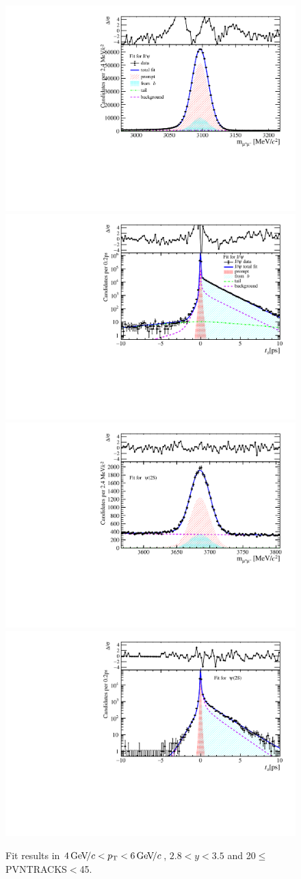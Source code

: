 \begin{figure}[H]
\begin{center}
\includegraphics[width=0.47\linewidth]{pdf/Jpsi/drawmass/n2y2pt3.pdf}
\includegraphics[width=0.47\linewidth]{pdf/Jpsi/2DFit/n2y2pt3.pdf}
\vspace*{-0.5cm}
\includegraphics[width=0.47\linewidth]{pdf/Psi2S/drawmass/n2y2pt3.pdf}
\includegraphics[width=0.47\linewidth]{pdf/Psi2S/2DFit/n2y2pt3.pdf}
\vspace*{-0.5cm}
\end{center}
\caption{Fit results in $4\text{\,Ge\kern -0.1em V\!/}c<p_{\mathrm{T}}<6\text{\,Ge\kern -0.1em V\!/}c$, $2.8<y<3.5$ and 20$\leq$PVNTRACKS$<$45.}
\label{Fitn2y2pt3}
\end{figure}
